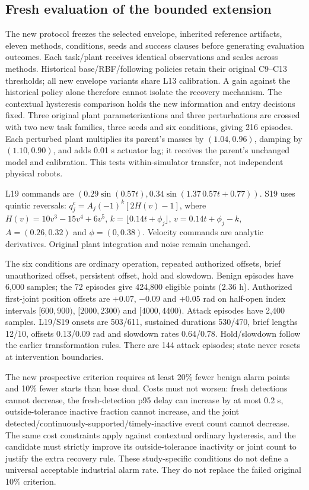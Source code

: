 \subsection{Fresh evaluation of the bounded extension}\label{sec:contextstudy}
The new protocol freezes the selected envelope, inherited reference artifacts, eleven methods, conditions, seeds and success clauses before generating evaluation outcomes. Each task/plant receives identical observations and scales across methods. Historical base/RBF/following policies retain their original C9--C13 thresholds; all new envelope variants share L13 calibration. A gain against the historical policy alone therefore cannot isolate the recovery mechanism. The contextual hysteresis comparison holds the new information and entry decisions fixed. Three original plant parameterizations and three perturbations are crossed with two new task families, three seeds and six conditions, giving 216 episodes. Each perturbed plant multiplies its parent's masses by $(1.04,0.96)$, damping by $(1.10,0.90)$, and adds 0.01 s actuator lag; it receives the parent's unchanged model and calibration. This tests within-simulator transfer, not independent physical robots.

L19 commands are $(0.29\sin(0.57t),0.34\sin(1.37\,0.57t+0.77))$. S19 uses quintic reversals: $q_j^c=A_j(-1)^k[2H(v)-1]$, where $H(v)=10v^3-15v^4+6v^5$, $k=\lfloor0.14t+\phi_j\rfloor$, $v=0.14t+\phi_j-k$, $A=(0.26,0.32)$ and $\phi=(0,0.38)$. Velocity commands are analytic derivatives. Original plant integration and noise remain unchanged.

The six conditions are ordinary operation, repeated authorized offsets, brief unauthorized offset, persistent offset, hold and slowdown. Benign episodes have 6,000 samples; the 72 episodes give 424,800 eligible points (2.36 h). Authorized first-joint position offsets are $+0.07$, $-0.09$ and $+0.05$ rad on half-open index intervals $[600,900)$, $[2000,2300)$ and $[4000,4400)$. Attack episodes have 2,400 samples. L19/S19 onsets are 503/611, sustained durations 530/470, brief lengths 12/10, offsets 0.13/0.09 rad and slowdown rates 0.64/0.78. Hold/slowdown follow the earlier transformation rules. There are 144 attack episodes; state never resets at intervention boundaries.

The new prospective criterion requires at least 20\% fewer benign alarm points and 10\% fewer starts than base dual. Costs must not worsen: fresh detections cannot decrease, the fresh-detection p95 delay can increase by at most 0.2 s, outside-tolerance inactive fraction cannot increase, and the joint detected/continuously-supported/timely-inactive event count cannot decrease. The same cost constraints apply against contextual ordinary hysteresis, and the candidate must strictly improve its outside-tolerance inactivity or joint count to justify the extra recovery rule. These study-specific conditions do not define a universal acceptable industrial alarm rate. They do not replace the failed original 10\% criterion.

